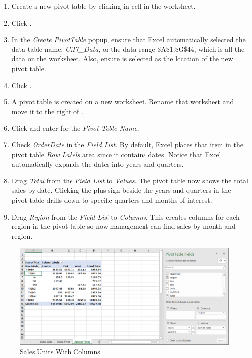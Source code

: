 \begin{enumerate}[resume]
	\item Create a new pivot table by clicking in cell  in the  worksheet.
	\item Click .
	\item In the \textit{Create PivotTable} popup, ensure that Excel automatically selected the data table name, \textit{CH7\_Data}, or the data range \$A\$1:\$G\$44, which is all the data on the worksheet. Also, ensure  is selected as the location of the new pivot table. 
	\item Click .
	\item A pivot table is created on a new worksheet. Rename that worksheet  and move it to the right of .
	\item Click  and enter  for the \textit{Pivot Table Name}.
	\item Check \textit{OrderDate} in the \textit{Field List}. By default, Excel places that item in the pivot table \textit{Row Labels} area since it contains dates. Notice that Excel automatically expands the dates into years and quarters.
	\item Drag \textit{Total} from the \textit{Field List} to \textit{Values}. The pivot table now shows the total sales by date. Clicking the plus sign beside the years and quarters in the pivot table drills down to specific quarters and months of interest.
	\item Drag \textit{Region} from the \textit{Field List} to \textit{Columns}. This creates columns for each region in the pivot table so now management can find sales by month and region.
\end{enumerate}	

\begin{figure}[H]
	\centering
	\includegraphics[width=\maxwidth{.95\linewidth}]{gfx/ch07_fig21}
	\caption{Sales Units With Columns}
	\label{07:fig21}
\end{figure}

